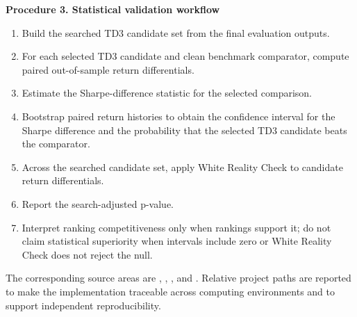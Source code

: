 \documentclass[12pt]{article}
\begin{document}
\textbf{Procedure 3. Statistical validation workflow}

\begin{enumerate}[label=\arabic*.,leftmargin=*]
    \item Build the searched TD3 candidate set from the final evaluation outputs.
    \item For each selected TD3 candidate and clean benchmark comparator, compute paired out-of-sample return differentials.
    \item Estimate the Sharpe-difference statistic for the selected comparison.
    \item Bootstrap paired return histories to obtain the confidence interval for the Sharpe difference and the probability that the selected TD3 candidate beats the comparator.
    \item Across the searched candidate set, apply White Reality Check to candidate return differentials.
    \item Report the search-adjusted p-value.
    \item Interpret ranking competitiveness only when rankings support it; do not claim statistical superiority when intervals include zero or White Reality Check does not reject the null.
\end{enumerate}

\begin{flushleft}
The corresponding source areas are , , , and . Relative project paths are reported to make the implementation traceable across computing environments and to support independent reproducibility.
\end{flushleft}

\end{document}
